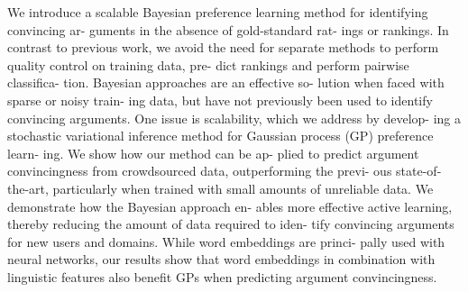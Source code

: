 We introduce a scalable Bayesian preference learning method for identifying convincing ar- guments in the absence of gold-standard rat- ings or rankings. In contrast to previous work, we avoid the need for separate methods to perform quality control on training data, pre- dict rankings and perform pairwise classifica- tion. Bayesian approaches are an effective so- lution when faced with sparse or noisy train- ing data, but have not previously been used to identify convincing arguments. One issue is scalability, which we address by develop- ing a stochastic variational inference method for Gaussian process (GP) preference learn- ing. We show how our method can be ap- plied to predict argument convincingness from crowdsourced data, outperforming the previ- ous state-of-the-art, particularly when trained with small amounts of unreliable data. We demonstrate how the Bayesian approach en- ables more effective active learning, thereby reducing the amount of data required to iden- tify convincing arguments for new users and domains. While word embeddings are princi- pally used with neural networks, our results show that word embeddings in combination with linguistic features also benefit GPs when predicting argument convincingness.